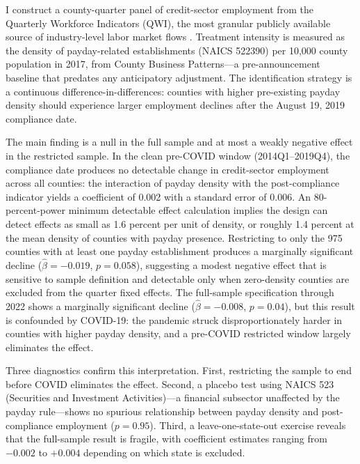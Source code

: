 \documentclass[12pt]{article}
\begin{document}
I construct a county-quarter panel of credit-sector employment from the Quarterly Workforce Indicators (QWI), the most granular publicly available source of industry-level labor market flows \citep{abowd2009}. Treatment intensity is measured as the density of payday-related establishments (NAICS 522390) per 10,000 county population in 2017, from County Business Patterns---a pre-announcement baseline that predates any anticipatory adjustment. The identification strategy is a continuous difference-in-differences: counties with higher pre-existing payday density should experience larger employment declines after the August 19, 2019 compliance date.

The main finding is a null in the full sample and at most a weakly negative effect in the restricted sample. In the clean pre-COVID window (2014Q1--2019Q4), the compliance date produces no detectable change in credit-sector employment across all counties: the interaction of payday density with the post-compliance indicator yields a coefficient of 0.002 with a standard error of 0.006. An 80-percent-power minimum detectable effect calculation implies the design can detect effects as small as 1.6 percent per unit of density, or roughly 1.4 percent at the mean density of counties with payday presence. Restricting to only the 975 counties with at least one payday establishment produces a marginally significant decline ($\hat{\beta} = -0.019$, $p = 0.058$), suggesting a modest negative effect that is sensitive to sample definition and detectable only when zero-density counties are excluded from the quarter fixed effects. The full-sample specification through 2022 shows a marginally significant decline ($\hat{\beta} = -0.008$, $p = 0.04$), but this result is confounded by COVID-19: the pandemic struck disproportionately harder in counties with higher payday density, and a pre-COVID restricted window largely eliminates the effect.

Three diagnostics confirm this interpretation. First, restricting the sample to end before COVID eliminates the effect. Second, a placebo test using NAICS 523 (Securities and Investment Activities)---a financial subsector unaffected by the payday rule---shows no spurious relationship between payday density and post-compliance employment ($p = 0.95$). Third, a leave-one-state-out exercise reveals that the full-sample result is fragile, with coefficient estimates ranging from $-0.002$ to $+0.004$ depending on which state is excluded.
\end{document}
